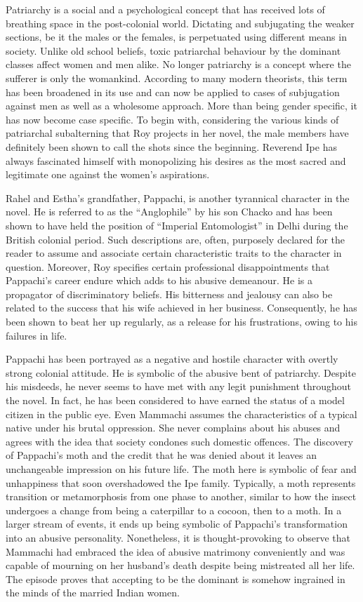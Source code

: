 Patriarchy is a social and a psychological concept that has received lots of breathing space in the post-colonial world. Dictating and subjugating the weaker sections, be it the males or the females, is perpetuated using different means in society. Unlike old school beliefs, toxic patriarchal behaviour by the dominant classes affect women and men alike. No longer patriarchy is a concept where the sufferer is only the womankind. According to many modern theorists, this term has been broadened in its use and can now be applied to cases of subjugation against men as well as a wholesome approach. More than being gender specific, it has now become case specific. To begin with, considering the various kinds of patriarchal subalterning that Roy projects in her novel, the male members have definitely been shown to call the shots since the beginning. Reverend Ipe has always fascinated himself with monopolizing his desires as the most sacred and legitimate one against the women’s aspirations. 

Rahel and Estha’s grandfather, Pappachi, is another tyrannical character in the novel. He is referred to as the “Anglophile” by his son Chacko and has been shown to have held the position of “Imperial Entomologist” in Delhi during the British colonial period. Such descriptions are, often, purposely declared for the reader to assume and associate certain characteristic traits to the character in question. Moreover, Roy specifies certain professional disappointments that Pappachi’s career endure which adds to his abusive demeanour. He is a propagator of discriminatory beliefs. His bitterness and jealousy can also be related to the success that his wife achieved in her business. Consequently, he has been shown to beat her up regularly, as a release for his frustrations, owing to his failures in life.

Pappachi has been portrayed as a negative and hostile character with overtly strong colonial attitude. He is symbolic of the abusive bent of patriarchy. Despite his misdeeds, he never seems to have met with any legit punishment throughout the novel. In fact, he has been considered to have earned the status of a model citizen in the public eye. Even Mammachi assumes the characteristics of a typical native under his brutal oppression. She never complains about his abuses and agrees with the idea that society condones such domestic offences. The discovery of Pappachi’s moth and the credit that he was denied about it leaves an unchangeable impression on his future life. The moth here is symbolic of fear and unhappiness that soon overshadowed the Ipe family. Typically, a moth represents transition or metamorphosis from one phase to another, similar to how the insect undergoes a change from being a caterpillar to a cocoon, then to a moth. In a larger stream of events, it ends up being symbolic of Pappachi’s transformation into an abusive personality. Nonetheless, it is thought-provoking to observe that Mammachi had embraced the idea of abusive matrimony conveniently and was capable of mourning on her husband’s death despite being mistreated all her life. The episode proves that accepting to be the dominant is somehow ingrained in the minds of the married Indian women. 

